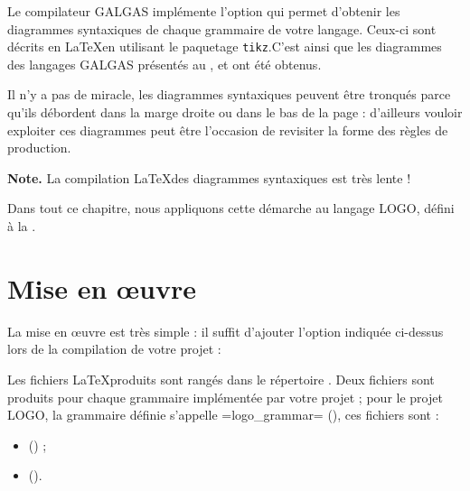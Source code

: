

Le compilateur GALGAS implémente l'option  qui permet d'obtenir les diagrammes syntaxiques de chaque grammaire de votre langage. Ceux-ci sont décrits en \LaTeX en utilisant le paquetage \texttt{tikz}\label{tikz}.C'est ainsi que les diagrammes des langages GALGAS présentés au ,  et  ont été obtenus.

Il n'y a pas de miracle, les diagrammes syntaxiques peuvent être tronqués parce qu'ils débordent dans la marge droite ou dans le bas de la page : d'ailleurs vouloir exploiter ces diagrammes peut être l'occasion de revisiter la forme des règles de production.

{\bf Note.} La compilation \LaTeX des diagrammes syntaxiques est très lente !

Dans tout ce chapitre, nous appliquons cette démarche au langage LOGO, défini à la .

\section{Mise en œuvre}

La mise en œuvre est très simple : il suffit d'ajouter l'option indiquée ci-dessus lors de la compilation de votre projet :
\begin{description}
  \item[ ] 
\end{description}

Les fichiers \LaTeX produits sont rangés dans le répertoire . Deux fichiers sont produits pour chaque grammaire implémentée par votre projet ; pour le projet LOGO, la grammaire définie s'appelle \ggs=logo_grammar= (), ces fichiers sont :
\begin{itemize}
\item {} () ;
\item {} ().
\end{itemize}


